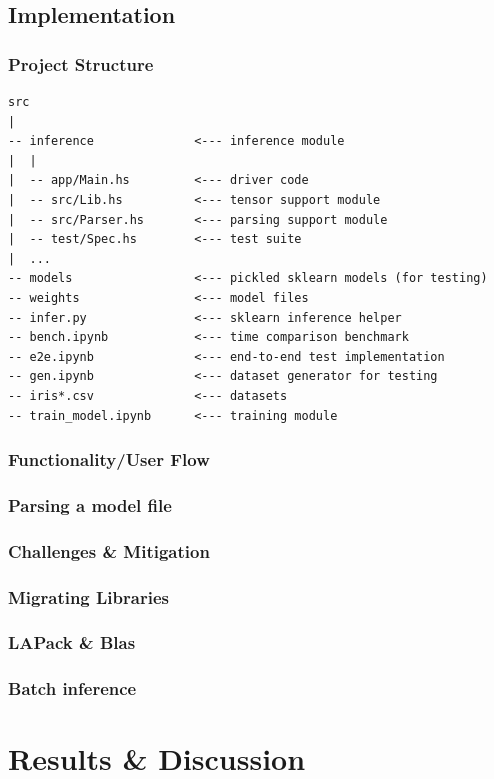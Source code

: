 \documentclass[12pt, titlepage]{article}
\begin{document}
\subsection{Implementation}
\subsubsection{Project Structure}
\begin{verbatim}
src
|
-- inference              <--- inference module
|  |
|  -- app/Main.hs         <--- driver code
|  -- src/Lib.hs          <--- tensor support module
|  -- src/Parser.hs       <--- parsing support module
|  -- test/Spec.hs        <--- test suite
|  ...
-- models                 <--- pickled sklearn models (for testing)
-- weights                <--- model files
-- infer.py               <--- sklearn inference helper
-- bench.ipynb            <--- time comparison benchmark
-- e2e.ipynb              <--- end-to-end test implementation
-- gen.ipynb              <--- dataset generator for testing
-- iris*.csv              <--- datasets
-- train_model.ipynb      <--- training module
\end{verbatim}

\subsubsection{Functionality/User Flow}
\subsubsection{Parsing a model file}

\subsubsection{Challenges \& Mitigation}
\subsubsection{Migrating Libraries}
\subsubsection{LAPack \& Blas}
\subsubsection{Batch inference}


\section{Results \& Discussion}
\end{document}
